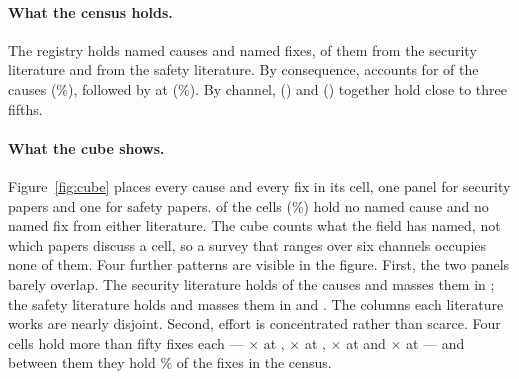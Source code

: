 \paragraph{What the census holds.} The registry holds \NMechanisms{} named
causes and \NFixes{} named fixes, \NDefSecurity{} of them from the
security literature and \NDefSafety{} from the safety literature. By
consequence,  accounts for \NMechGoalHijack{} of the
causes (\PctMechGoalHijack{}\%), followed by 
at \NMechReasoning{} (\PctMechReasoning{}\%). By channel,
 (\NMechDirectInput{}) and 
(\NMechToolOutput{}) together hold close to three fifths.

\paragraph{What the cube shows.} Figure~\ref{fig:cube} places every
cause and every fix in its cell, one panel for security papers and one for safety papers.
\NCubeEmpty{} of the \NCubeCells{} cells (\PctCubeEmpty{}\%) hold no named
cause and no named fix from either literature. The cube counts what the
field has named, not which papers discuss a cell, so a survey that ranges over
six channels occupies none of them. Four further patterns are visible in the
figure. First, the two panels barely overlap. The security literature holds
\NMechSecurity{} of the \NMechanisms{} causes and masses them in
; the safety literature holds \NMechSafety{} and masses them
in  and . The columns each
literature works are nearly disjoint. Second, effort is concentrated rather than scarce. Four cells hold more than fifty
fixes each ---  $\times$  at
\NDefCellToolOutGoalHijack{},  $\times$
 at \NDefCellDirectInGoalHijack{},  $\times$
 at \NDefCellRagSilent{} and 
$\times$  at \NDefCellMemReasoning{} --- and
between them they hold \PctTopFourDef{}\% of the \NFixes{} fixes in the
census.

